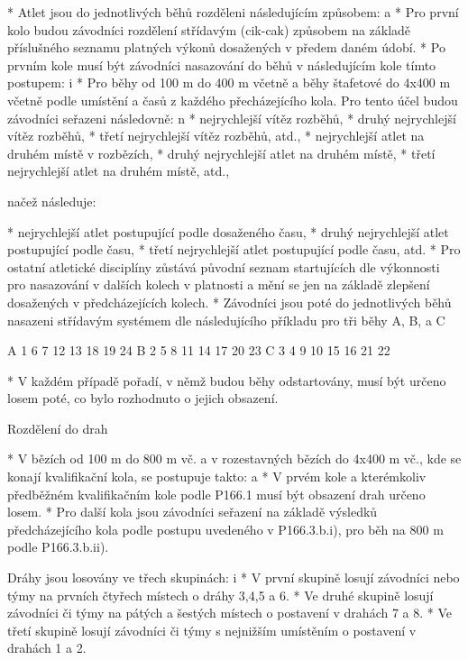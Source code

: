 * Atlet jsou do jednotlivých běhů rozděleni následujícím způsobem:
  \begitems \style a
  * Pro první kolo budou závodníci rozdělení střídavým (cik-cak) způsobem na základě příslušného seznamu platných výkonů dosažených v předem daném údobí.
  * Po prvním kole musí být závodníci nasazování do běhů v následujícím kole tímto postupem:
    \begitems \style i
    * Pro běhy od 100 m do 400 m včetně a běhy štafetové do 4x400 m včetně podle umístění a časů z každého přecházejícího kola. Pro tento účel budou závodníci seřazeni následovně:
      \begitems \style n
      * nejrychlejší vítěz rozběhů,
      * druhý nejrychlejší vítěz rozběhů,
      * třetí nejrychlejší vítěz rozběhů, atd.,
      * nejrychlejší atlet na druhém místě v rozbězích,
      * druhý nejrychlejší atlet na druhém místě,
      * třetí nejrychlejší atlet na druhém místě, atd.,

      načež následuje:

      * nejrychlejší atlet postupující podle dosaženého času,
      * druhý nejrychlejší atlet postupující podle času,
      * třetí nejrychlejší atlet postupující podle času, atd.
      \enditems
    * Pro ostatní atletické disciplíny zůstává původní seznam startujících dle výkonnosti pro nasazování v dalších kolech v platnosti a mění se jen na základě zlepšení dosažených v předcházejících kolech.
    \enditems
  * Závodníci jsou poté do jednotlivých běhů nasazeni střídavým systémem dle následujícího příkladu pro tři běhy A, B, a C

A          1   6   7   12   13   18   19   24
B          2   5   8   11   14   17   20   23
C          3   4   9   10   15   16   21   22

  * V každém případě pořadí, v němž budou běhy odstartovány, musí být určeno losem poté, co bylo rozhodnuto o jejich obsazení.
  \enditems

Rozdělení do drah

* V bězích od 100 m do 800 m vč. a v rozestavných bězích do 4x400 m vč., kde se konají kvalifikační kola, se postupuje takto:
  \begitems \style a
  * V prvém kole a kterémkoliv předběžném kvalifikačním kole podle P166.1 musí být obsazení drah určeno losem.
  * Pro další kola jsou závodníci seřazení na základě výsledků předcházejícího kola podle postupu uvedeného v P166.3.b.i), pro běh na 800 m podle P166.3.b.ii).

  Dráhy jsou losovány ve třech skupinách:
    \begitems \style i
    * V první skupině losují závodníci nebo týmy na prvních čtyřech místech o dráhy 3,4,5 a 6.
    * Ve druhé skupině losují závodníci či týmy na pátých a šestých místech o postavení v drahách 7 a 8.
    * Ve třetí skupině losují závodníci či týmy s nejnižším umístěním o postavení v drahách 1 a 2.
    \enditems
  \enditems

